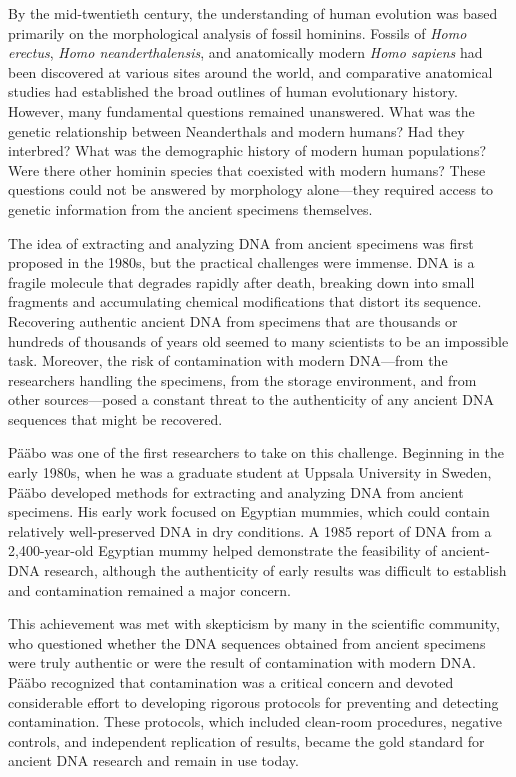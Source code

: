 By the mid-twentieth century, the understanding of human evolution was based primarily on the morphological analysis of fossil hominins. Fossils of \textit{Homo erectus}, \textit{Homo neanderthalensis}, and anatomically modern \textit{Homo sapiens} had been discovered at various sites around the world, and comparative anatomical studies had established the broad outlines of human evolutionary history. However, many fundamental questions remained unanswered. What was the genetic relationship between Neanderthals and modern humans? Had they interbred? What was the demographic history of modern human populations? Were there other hominin species that coexisted with modern humans? These questions could not be answered by morphology alone---they required access to genetic information from the ancient specimens themselves.

The idea of extracting and analyzing DNA from ancient specimens was first proposed in the 1980s, but the practical challenges were immense. DNA is a fragile molecule that degrades rapidly after death, breaking down into small fragments and accumulating chemical modifications that distort its sequence. Recovering authentic ancient DNA from specimens that are thousands or hundreds of thousands of years old seemed to many scientists to be an impossible task. Moreover, the risk of contamination with modern DNA---from the researchers handling the specimens, from the storage environment, and from other sources---posed a constant threat to the authenticity of any ancient DNA sequences that might be recovered.

P\"a\"abo was one of the first researchers to take on this challenge. Beginning in the early 1980s, when he was a graduate student at Uppsala University in Sweden, P\"a\"abo developed methods for extracting and analyzing DNA from ancient specimens. His early work focused on Egyptian mummies, which could contain relatively well-preserved DNA in dry conditions. A 1985 report of DNA from a 2,400-year-old Egyptian mummy helped demonstrate the feasibility of ancient-DNA research, although the authenticity of early results was difficult to establish and contamination remained a major concern.

This achievement was met with skepticism by many in the scientific community, who questioned whether the DNA sequences obtained from ancient specimens were truly authentic or were the result of contamination with modern DNA. P\"a\"abo recognized that contamination was a critical concern and devoted considerable effort to developing rigorous protocols for preventing and detecting contamination. These protocols, which included clean-room procedures, negative controls, and independent replication of results, became the gold standard for ancient DNA research and remain in use today.

